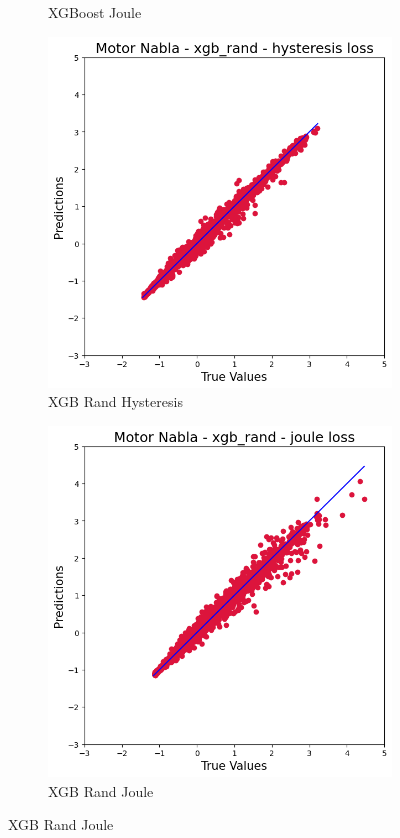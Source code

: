 \documentclass{article}
\begin{document}
\begin{figure}[!htbp]
\begin{subfigure}[b]{0.23\textwidth}
        \caption{XGBoost Joule}
    \end{subfigure}
    \hfill
    \begin{subfigure}[b]{0.23\textwidth}
        \centering
        \includegraphics[width=\textwidth]{images/Nabla/xgb_rand_hysteresis.png}
        \caption{XGB Rand Hysteresis}
    \end{subfigure}
    \hfill
    \begin{subfigure}[b]{0.23\textwidth}
        \centering
        \includegraphics[width=\textwidth]{images/Nabla/xgb_rand_joule.png}
        \caption{XGB Rand Joule}
    \end{subfigure}
    

\end{figure}
\end{document}
